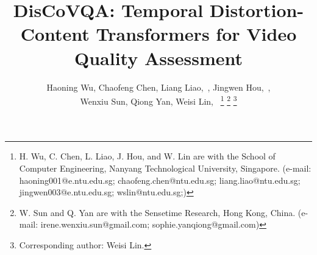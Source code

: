 \documentclass[journal]{IEEEtran}
\begin{document}
\title{DisCoVQA: Temporal Distortion-Content Transformers for Video Quality Assessment}


\author{Haoning Wu,
        Chaofeng Chen,
        Liang Liao,~,
        Jingwen Hou,~,\\
        Wenxiu Sun,
        Qiong Yan,
        Weisi Lin,~
\thanks{H. Wu, C. Chen, L. Liao, J. Hou, and W. Lin are with the School of Computer Engineering, Nanyang Technological University, Singapore. (e-mail: haoning001@e.ntu.edu.sg; chaofeng.chen@ntu.edu.sg; liang.liao@ntu.edu.sg; jingwen003@e.ntu.edu.sg; wslin@ntu.edu.sg;)}
\thanks{W. Sun and Q. Yan are with the Sensetime Research, Hong Kong, China. (e-mail: irene.wenxiu.sun@gmail.com;  sophie.yanqiong@gmail.com)}
\thanks{Corresponding author: Weisi Lin.}}




\maketitle
\end{document}
